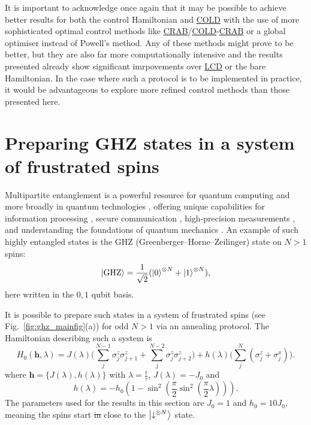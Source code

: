 \documentclass[a4paper,oneside,11pt]{book}
\newcommand{\hbb}{\boldsymbol{h}}
\newcommand{\sx}{\sigma^x}
\newcommand{\sz}{\sigma^z}
\newcommand{\acrref}[1]{\hyperref[acr:#1]{#1}}
\providecommand{\DIFaddtex}[1]{{\protect\color{blue}\uwave{#1}}} %
\providecommand{\DIFdeltex}[1]{{\protect\color{red}\sout{#1}}}                      %
\providecommand{\DIFaddbegin}{} %
\providecommand{\DIFaddend}{} %
\providecommand{\DIFdelbegin}{} %
\providecommand{\DIFdelend}{} %
\providecommand{\DIFadd}[1]{\texorpdfstring{\DIFaddtex{#1}}{#1}} %
\providecommand{\DIFdel}[1]{\texorpdfstring{\DIFdeltex{#1}}{}} %
\newcommand{\DIFscaledelfig}{0.5}
\newlength{\DIFdelgraphicswidth} %
\newlength{\DIFdelgraphicsheight} %
\newcommand{\DIFaddincludegraphics}[2][]{{\color{blue}\fbox{\DIFOincludegraphics[#1]{#2}}}} %
\newcommand{\DIFdelincludegraphics}[2][]{%
\sbox{\DIFdelgraphicsbox}{\DIFOincludegraphics[#1]{#2}}%
\settoboxwidth{\DIFdelgraphicswidth}{\DIFdelgraphicsbox} %
\settoboxtotalheight{\DIFdelgraphicsheight}{\DIFdelgraphicsbox} %
\scalebox{\DIFscaledelfig}{%
\parbox[b]{\DIFdelgraphicswidth}{\usebox{\DIFdelgraphicsbox}\\[-\baselineskip] \rule{\DIFdelgraphicswidth}{0em}}\llap{\resizebox{\DIFdelgraphicswidth}{\DIFdelgraphicsheight}{%
\setlength{\unitlength}{\DIFdelgraphicswidth}%
\begin{picture}(1,1)%
\thicklines\linethickness{2pt} %
{\color[rgb]{1,0,0}\put(0,0){\framebox(1,1){}}}%
{\color[rgb]{1,0,0}\put(0,0){\line( 1,1){1}}}%
{\color[rgb]{1,0,0}\put(0,1){\line(1,-1){1}}}%
\end{picture}%
}\hspace*{3pt}}} %
} %
\DeclareRobustCommand{\DIFaddbegin}{\DIFOaddbegin \let\includegraphics\DIFaddincludegraphics} %
\DeclareRobustCommand{\DIFaddend}{\DIFOaddend \let\includegraphics\DIFOincludegraphics} %
\DeclareRobustCommand{\DIFdelbegin}{\DIFOdelbegin \let\includegraphics\DIFdelincludegraphics} %
\DeclareRobustCommand{\DIFdelend}{\DIFOaddend \let\includegraphics\DIFOincludegraphics} %
\begin{document}
It is important to acknowledge once again that it may be possible to achieve better results for both the control Hamiltonian and \acrref{COLD} with the use of more sophisticated optimal control methods like \acrref{CRAB}/\acrref{COLD}-\acrref{CRAB} or a global optimiser instead of Powell's method. Any of these methods might prove to be better, but they are also far more computationally intensive and the results presented already show significant imrpovements over \acrref{LCD} or the bare Hamiltonian. In the case where such a protocol is to be implemented in practice, it would be advantageous to explore more refined control methods than those presented here.

\section{Preparing GHZ states in a system of frustrated spins}\label{sec:6.4_ghz_states}

Multipartite entanglement is a powerful resource for quantum computing and more broadly in quantum technologies \DIFaddbegin \DIFadd{as a whole}\DIFaddend , offering unique capabilities for information processing \cite{nielsen_quantum_2010}, secure communication \cite{bostrom_deterministic_2002}, high-precision measurements \cite{kim_heisenberg-limited_2022}, and understanding the foundations of quantum mechanics \cite{einstein_can_1935}. An example of such highly entangled states is the GHZ (Greenberger–Horne–Zeilinger) state \cite{greenberger_bells_1990} on $N > 1$ spins:
\begin{equation}\label{eq:GHZ_state}
    \ket{\rm GHZ} = \frac{1}{\sqrt{2}} (\ket{0}^{\otimes N} + \ket{1}^{\otimes N}),
\end{equation}
here written in the $0,1$ qubit basis.

It is possible to prepare such states in a system of frustrated spins (see Fig.~\ref{fig:ghz_mainfig}(a)) for odd $N > 1$ via an annealing protocol. The Hamiltonian describing such a system is
\begin{equation}\label{eq:ghz_hamiltonian}
    H_0(\hbb, \lambda) = J(\lambda) \Big( \sum_{j}^{N-1} \sz_j \sz_{j+1} + \sum_{j}^{N-2} \sz_j \sz_{j+2} \Big) + h(\lambda) \Big( \sum_j^N (\sz_j + \sx_j) \Big).
\end{equation}
where $\hbb = \{ J(\lambda), h(\lambda) \}$ with $\lambda = \frac{t}{\tau}$, $J(\lambda)= - J_0$ and
\begin{equation}
    h(\lambda) = - h_0 \left(1 - \sin^2\left(\frac{\pi}{2} \sin^2 \left( \frac{\pi}{2} \lambda \right) \right)\right).
\end{equation}
The parameters used for the results in this section are $J_0 = 1$ and $h_0 = 10J_0$, meaning the spins start \DIFdelbegin \DIFdel{in }\DIFdelend close to the $\ket{\downarrow^{\otimes N}}$ state. 
\end{document}
